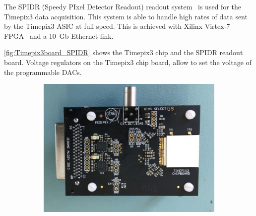 The SPIDR (Speedy PIxel Detector Readout) readout
system~\cite{Visser:2015bsa} is used for the Timepix3 data
acquisition. This system is able to handle high rates of data sent by
the Timepix3 ASIC at full speed. This is achieved with Xilinx Virtex-7
FPGA~\cite{XilinxVirtex7} and a 10~Gb Ethernet link.

\cref{fig:Timepix3board_SPIDR} shows the Timepix3 chip and the SPIDR
readout board. Voltage regulators on the Timepix3 chip board, allow to
set the voltage of the programmable DACs.

\begin{figure}[htbp] \centering
  \begin{subfigure}[b]{0.3\textwidth}
    \includegraphics[width=\textwidth]{./figures/Calibration/Timepix3board2.jpg}
    \caption{}\label{fig:Timepix3board_PCB}
  \end{subfigure}\hfill
  \begin{subfigure}[b]{0.65\textwidth}

\end{subfigure}
\end{figure}
